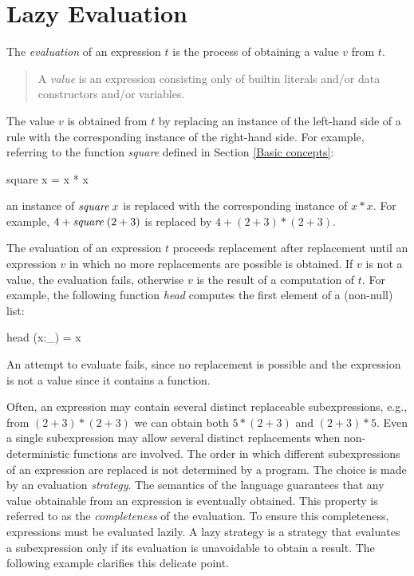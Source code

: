 
\section{Lazy Evaluation}
\label{sec-lazy-evaluation}

The \emph{evaluation}
of an expression $t$ is the process of
obtaining a value $v$ from $t$.
%
\begin{quote}
A \emph{value} is an expression consisting
only of builtin literals and/or data constructors and/or variables.
\end{quote}
%
The value $v$ is obtained from $t$ by replacing an instance of
the left-hand side of a rule with the corresponding
instance of the right-hand side.
For example, referring to the function \emph{square} defined
in Section \ref{Basic concepts}:
%
\begin{curry}
square x = x * x
\end{curry}
%
an instance of $\emph{square}\;x$
is replaced with the corresponding instance of $x * x$.
For example, $4+\emph{square}\;(2+3)$ is replaced by $4+(2+3)*(2+3)$.

The evaluation of an expression $t$ 
proceeds replacement after replacement until an expression $v$
in which no more replacements are possible is obtained.
If $v$ is not a value, the evaluation fails,
otherwise $v$ is the result of a computation of $t$.
For example, the following function \emph{head}
computes the first element of a (non-null) list:
%
\begin{curry}
head (x:_) = x
\end{curry}
%
An attempt to evaluate  fails, since
no replacement is possible and the expression is not a value
since it contains a function.

Often, an expression may contain several distinct replaceable subexpressions,
e.g., from $(2+3)*(2+3)$ we can obtain both $5*(2+3)$ and $(2+3)*5$.
Even a single subexpression may allow several distinct replacements
when non-deterministic functions are involved.
The order in which different subexpressions of an expression are
replaced is not determined by a program.
The choice is made by an evaluation
\emph{strategy}.
The semantics of the language guarantees that any
value obtainable from an expression is eventually obtained.
This property is referred to as the
\emph{completeness}
of the evaluation.
To ensure this completeness, expressions must be evaluated
lazily.
A lazy strategy is a strategy that evaluates a subexpression
only if its evaluation is unavoidable to obtain a result.
The following example clarifies this delicate point.


